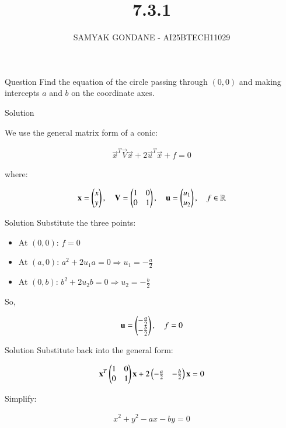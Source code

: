 \documentclass{beamer}
\title 
{7.3.1}
\date{}
\author
{SAMYAK GONDANE - AI25BTECH11029}
\begin{document}
\frame{\titlepage}

\begin{frame}{Question}
Find the equation of the circle passing through $(0, 0)$ and making intercepts $a$ and $b$ on the coordinate axes.
\end{frame}


\begin{frame}{Solution}

We use the general matrix form of a conic:


\begin{align}
\vec{x}^T \vec{V} \vec{x} + 2\vec{u}^T \vec{x} + f = 0
\end{align}


where:


\begin{align}
\mathbf{x} = \begin{pmatrix}x \\ y\end{pmatrix}, \quad
\mathbf{V} = \begin{pmatrix}1 & 0 \\ 0 & 1\end{pmatrix}, \quad
\mathbf{u} = \begin{pmatrix}u_1 \\ u_2\end{pmatrix}, \quad
f \in \mathbb{R}
\end{align}
\end{frame}


\begin{frame}{Solution}
Substitute the three points:

\begin{itemize}
  \item At $(0, 0)$: $f = 0$
  \item At $(a, 0)$: $a^2 + 2u_1 a = 0 \Rightarrow u_1 = -\frac{a}{2}$
  \item At $(0, b)$: $b^2 + 2u_2 b = 0 \Rightarrow u_2 = -\frac{b}{2}$
\end{itemize}

So,


\begin{align}
\mathbf{u} = \begin{pmatrix}-\frac{a}{2} \\ -\frac{b}{2}\end{pmatrix}, \quad f = 0
\end{align}
\end{frame}


\begin{frame}{Solution}
Substitute back into the general form:


\begin{align}
\mathbf{x}^T \begin{pmatrix}1 & 0 \\ 0 & 1\end{pmatrix} \mathbf{x}
+ 2 \begin{pmatrix}-\frac{a}{2} & -\frac{b}{2}\end{pmatrix} \mathbf{x}
= 0
\end{align}



Simplify:


\begin{align}
x^2 + y^2 - ax - by = 0
\end{align}
\end{frame}
\end{document}
